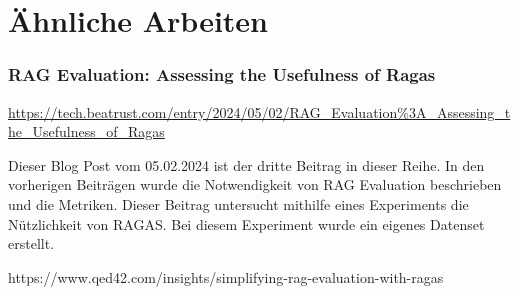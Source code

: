 \chapter{Ähnliche Arbeiten}

\subsection{RAG Evaluation: Assessing the Usefulness of Ragas}
\url{https://tech.beatrust.com/entry/2024/05/02/RAG_Evaluation%3A_Assessing_the_Usefulness_of_Ragas}


Dieser Blog Post vom 05.02.2024 ist der dritte Beitrag in dieser Reihe. In den vorherigen Beiträgen wurde die Notwendigkeit von RAG Evaluation beschrieben und die Metriken.
Dieser Beitrag untersucht mithilfe eines Experiments die Nützlichkeit von RAGAS. Bei diesem Experiment wurde ein eigenes Datenset erstellt.


https://www.qed42.com/insights/simplifying-rag-evaluation-with-ragas